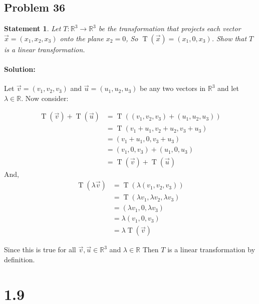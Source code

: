 \documentclass[12pt, letterpaper]{article}
\newcommand{\R}{\mathbb{R}}
\theoremstyle{statement}
\theoremstyle{statement}
\newtheorem*{atmStat}{Statement}
\newenvironment{Solution}{\noindent\ignorespaces\paragraph{Solution:}}{\hfill \ding{122}\par\noindent}
\begin{document}
        \subsection*{Problem 36}
        \begin{atmStat}
        Let $T: \R^3 \longrightarrow \R^3$ be the transformation that projects each vector $\Vec{x} = (x_1, x_2, x_3)$ onto the plane $x_2 = 0$, So $\operatorname{T}(\Vec{x}) = (x_1,0, x_3)$. Show that $T$ is a linear transformation. 
        \end{atmStat}
        \begin{Solution}
        Let $\Vec{v} = (v_1, v_2, v_3)$ and $\Vec{u} = (u_1, u_2, u_3)$ be any two vectors in $\R^3$ and let $\lambda \in \R$. Now consider:
        
        \begin{align*}
            \operatorname{T}(\Vec{v}) +
            \operatorname{T}(\Vec{u})
            & = \operatorname{T}((v_1, v_2, v_3) + (u_1, u_2, u_3)) \\
            & = \operatorname{T}(v_1 + u_1, v_2 + u_2, v_3 + u_3) \\
            & = (v_1 + u_1, 0, v_3 + u_3) \\
            & = (v_1, 0, v_3) + (u_1, 0, u_3) \\
            & = \operatorname{T}(\Vec{v}) + \operatorname{T}(\Vec{u})
        \end{align*}
        And,
        \begin{align*}
            \operatorname{T}(\lambda\Vec{v})
            & = \operatorname{T}(\lambda(v_1, v_2, v_3)) \\
            & = \operatorname{T}(\lambda v_1, \lambda v_2, \lambda v_3) \\
            & = (\lambda v_1, 0, \lambda v_3) \\
            & = \lambda (v_1, 0, v_3) \\
            & = \lambda \operatorname{T}(\Vec{v})
        \end{align*}
        
        Since this is true for all $\Vec{v}, \Vec{u} \in \R^3$ and $\lambda \in \R$ Then $T$ is a linear transformation by definition.
        
        \end{Solution}
        
        \section*{1.9}
        
\end{document}
